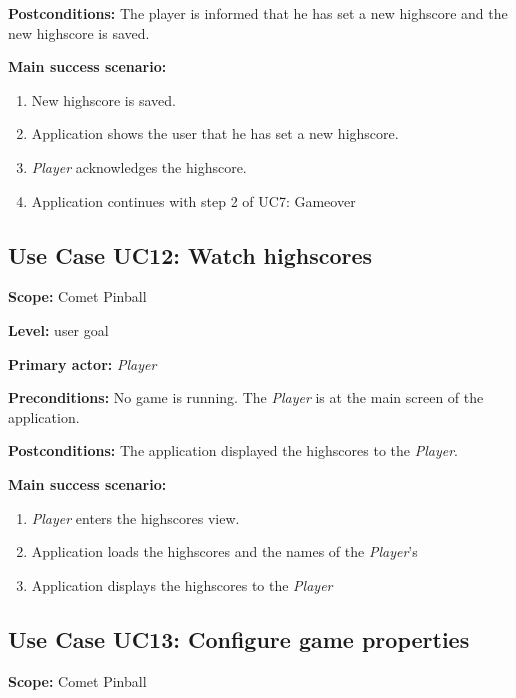 \documentclass[fontsize=12pt,
               paper=a4,
               twoside=false,
               parskip=half,
               ]{scrartcl}
\begin{document}
\textbf{\textsf{Postconditions:}} The player is informed that he has set a new highscore and the new highscore is saved.

\textbf{\textsf{Main success scenario:}}

\begin{enumerate}[leftmargin=3em]
	\item New highscore is saved.
	\item Application shows the user that he has set a new highscore.
	\item \emph{Player} acknowledges the highscore.
	\item Application continues with step 2 of UC7: Gameover
\end{enumerate}




\subsection{Use Case UC12: Watch highscores }

\textbf{\textsf{Scope:}} Comet Pinball

\textbf{\textsf{Level:}} user goal

\textbf{\textsf{Primary actor:}} \emph{Player}

\textbf{\textsf{Preconditions:}} No game is running. The \emph{Player} is at the main screen of the application.

\textbf{\textsf{Postconditions:}} The application displayed the highscores to the \emph{Player}.

\textbf{\textsf{Main success scenario:}}

\begin{enumerate}[leftmargin=3em]
	\item \emph{Player} enters the highscores view.
	\item Application loads the highscores and the names of the \emph{Player}'s
	\item Application displays the highscores to the \emph{Player}
\end{enumerate}




\subsection{Use Case UC13: Configure game properties }

\textbf{\textsf{Scope:}} Comet Pinball
\end{document}
